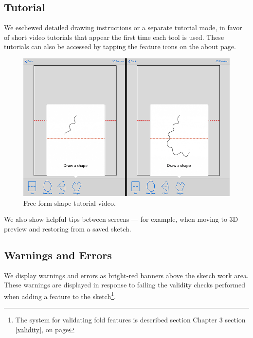 \subsection{Tutorial}\label{tutorial}

We eschewed detailed drawing instructions or a separate tutorial mode,
in favor of short video tutorials that appear the first time each tool
is used. These tutorials can also be accessed by tapping the feature
icons on the about page.

\begin{figure}[htbp]
\centering
\includegraphics{figures/32_UI_Tool_Interactions/tutorial_step_one_two.png}
\caption{Free-form shape tutorial video.}
\end{figure}

We also show helpful tips between screens --- for example, when moving
to 3D preview and restoring from a saved sketch.

\subsection{Warnings and Errors}\label{warnings-and-errors}

We display warnings and errors as bright-red banners above the sketch
work area. These warnings are displayed in response to failing the
validity checks performed when adding a feature to the sketch\footnote{The
  system for validating fold features is described section Chapter 3
  section \ref{validity},  on page \pageref{validity}}.

